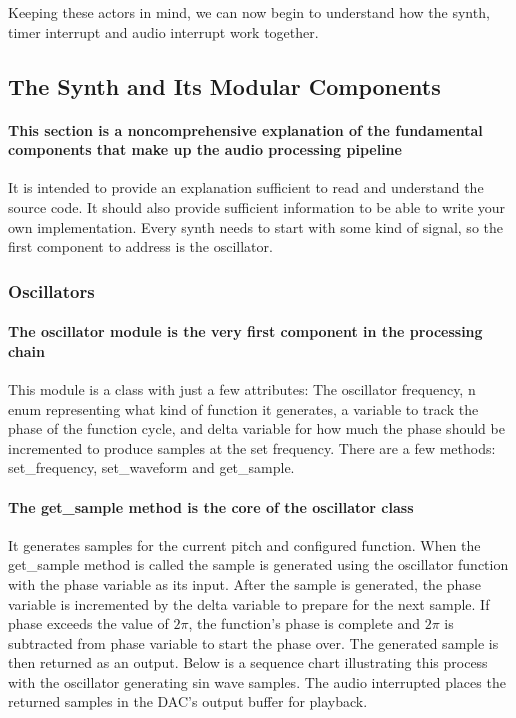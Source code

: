 \documentclass[acmlarge,screen]{acmart}
\begin{document}
	Keeping these actors in mind, we can now begin to understand how the synth, timer interrupt and audio interrupt work together.
	
\subsection{The Synth and Its Modular Components}
	\paragraph{This section is a noncomprehensive explanation of the fundamental components that make up the audio processing pipeline} It is intended to provide an explanation sufficient to read and understand the source code. It should also provide sufficient information to be able to write your own implementation. Every synth needs to start with some kind of signal, so the first component to address is the oscillator.
	
	\subsubsection{Oscillators}
	\paragraph{The oscillator module is the very first component in the processing chain} This module is a class with just a few attributes: The oscillator frequency, n enum representing what kind of function it generates, a variable to track the phase of the function cycle, and delta variable for how much the phase should be incremented to produce samples at the set frequency. There are a few methods: set\_frequency, set\_waveform and get\_sample. 
		
	\paragraph{The get\_sample method is the core of the oscillator class} It generates samples for the current pitch and configured function. When the get\_sample method is called the sample is generated using the oscillator function with the phase variable as its input. After the sample is generated, the phase variable is incremented by the delta variable to prepare for the next sample. If phase exceeds the value of \( 2\pi \), the function's phase is complete and \( 2\pi \) is subtracted from phase variable to start the phase over. The generated sample is then returned as an output. Below is a sequence chart illustrating this process with the oscillator generating sin wave samples. The audio interrupted places the returned samples in the DAC's output buffer for playback.\cite{farnell_2010}
	
\end{document}
